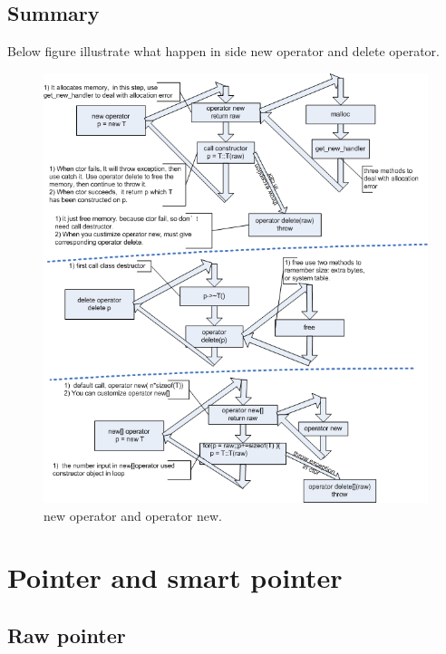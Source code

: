 \documentclass[a4paper,11pt,twoside]{book}
\begin{document}
\section{Summary}
Below figure illustrate what happen in side new operator and delete operator.
\begin{figure}[ht]
	\centering
	\includegraphics[width=0.90\linewidth]{pics/new.png}
	\caption{new operator and operator new.}
	\label{fig:smartpointer}
\end{figure}


\chapter{Pointer and smart pointer}

\section{Raw pointer}
\end{document}
